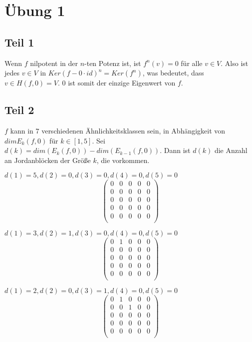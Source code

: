 \documentclass[10pt,a4paper]{article}
\begin{document}
\section*{Übung 1}

\subsection*{Teil 1}

Wenn $f$ nilpotent in der $n$-ten Potenz ist, ist $f^{n}(v) = 0$ für alle $v \in V$.
Also ist jedes $v \in V$ in $Ker(f - 0 \cdot id)^{n} = Ker(f^{n})$, was bedeutet, dass $v \in H(f, 0) = V$.
$0$ ist somit der einzige Eigenwert von $f$.

\subsection*{Teil 2}

$f$ kann in $7$ verschiedenen Ähnlichkeitsklassen sein, in Abhängigkeit von $dim E_{k}(f, 0)$ für $k \in [1, 5]$.
Sei $d(k) = dim(E_{k}(f, 0)) - dim(E_{k - 1}(f, 0))$.
Dann ist $d(k)$ die Anzahl an Jordanblöcken der Größe $k$, die vorkommen.

$d(1) = 5, d(2) = 0, d(3) = 0, d(4) = 0, d(5) = 0$
\begin{equation}
\begin{pmatrix}
0 & 0 & 0 & 0 & 0\\
0 & 0 & 0 & 0 & 0\\
0 & 0 & 0 & 0 & 0\\
0 & 0 & 0 & 0 & 0\\
0 & 0 & 0 & 0 & 0\\
\end{pmatrix}
\end{equation}

$d(1) = 3, d(2) = 1, d(3) = 0, d(4) = 0, d(5) = 0$
\begin{equation}
\begin{pmatrix}
0 & 1 & 0 & 0 & 0\\
0 & 0 & 0 & 0 & 0\\
0 & 0 & 0 & 0 & 0\\
0 & 0 & 0 & 0 & 0\\
0 & 0 & 0 & 0 & 0\\
\end{pmatrix}
\end{equation}

$d(1) = 2, d(2) = 0, d(3) = 1, d(4) = 0, d(5) = 0$
\begin{equation}
\begin{pmatrix}
0 & 1 & 0 & 0 & 0\\
0 & 0 & 1 & 0 & 0\\
0 & 0 & 0 & 0 & 0\\
0 & 0 & 0 & 0 & 0\\
0 & 0 & 0 & 0 & 0\\
\end{pmatrix}
\end{equation}
\end{document}
